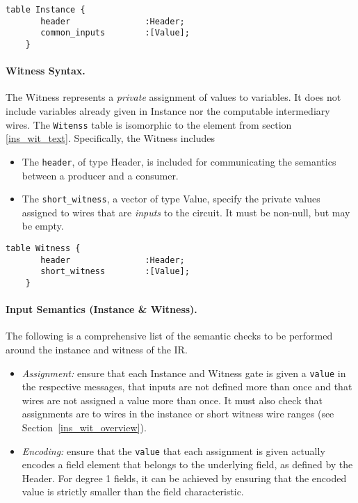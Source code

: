 \begin{lstlisting}[style=fbslisting]
    table Instance {
       header               :Header;
       common_inputs        :[Value];
    }
\end{lstlisting}

\paragraph{Witness Syntax.}  The \textsf{Witness} represents a \emph{private} assignment of values to variables. It does not include variables already given in \textsf{Instance} nor the computable intermediary wires. The \texttt{Witenss} table is isomorphic to the  element from section \ref{ins_wit_text}. Specifically, the
 \textsf{Witness} includes

\begin{itemize}
    \item The \texttt{header}, of type \textsf{Header}, is included for communicating the semantics between a producer and a consumer.
    \item The \texttt{short\_witness}, a vector of type \textsf{Value}, specify the private values assigned to wires that are \emph{inputs} to the circuit. It must be non-null, but may be empty.
\end{itemize}

\begin{lstlisting}[style=fbslisting]
    table Witness {
       header               :Header;
       short_witness        :[Value];
    }
\end{lstlisting}

\paragraph{Input Semantics (Instance \& Witness).} The following is a comprehensive list of the semantic checks to be performed around the instance and witness of the IR.

\begin{itemize}
    \item \textit{Assignment:} ensure that each \textsf{Instance} and \textsf{Witness} gate is given a \texttt{value} in the respective messages, that inputs are not defined more than once and that wires are not assigned a value more than once. It must also check that assignments are to wires in the instance or short witness wire ranges (see Section~\ref{ins_wit_overview}).
    \item \textit{Encoding:} ensure that the \texttt{value} that each assignment is given actually encodes a field element that belongs to the underlying field, as defined by the \textsf{Header}. For degree 1 fields, it can be achieved by ensuring that the encoded value is strictly smaller than the field characteristic.
\end{itemize}

